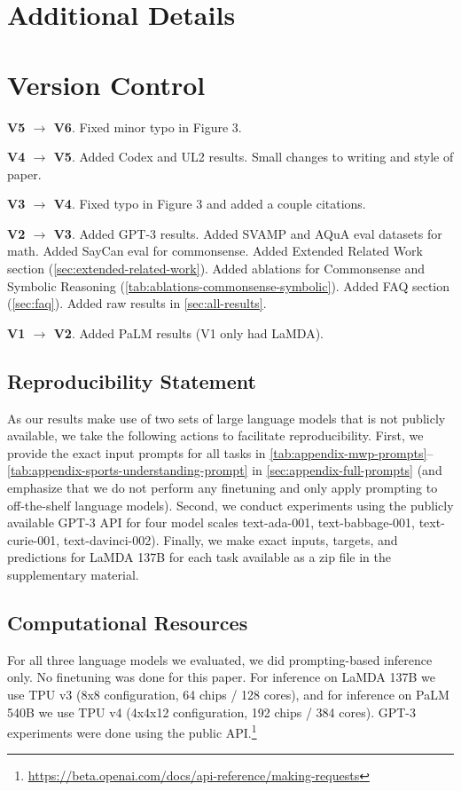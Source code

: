 \documentclass[]{article}
\theoremstyle{plain}
\theoremstyle{definition}
\theoremstyle{remark}
\newcommand{\lamda}[0]{LaMDA}
\newcommand{\palm}[0]{PaLM}
\begin{document}
\clearpage
\section{Additional Details}


\section*{Version Control}
\textbf{V5 $\rightarrow$ V6}. Fixed minor typo in Figure 3.  

\textbf{V4 $\rightarrow$ V5}. Added Codex and UL2 results. Small changes to writing and style of paper.

\textbf{V3 $\rightarrow$ V4}. Fixed typo in Figure 3 and added a couple citations.

\textbf{V2 $\rightarrow$ V3}. Added GPT-3 results. Added SVAMP and AQuA eval datasets for math. Added SayCan eval for commonsense. Added Extended Related Work section (\cref{sec:extended-related-work}). Added ablations for Commonsense and Symbolic Reasoning (\cref{tab:ablations-commonsense-symbolic}). Added FAQ section (\cref{sec:faq}). Added raw results in \cref{sec:all-results}.

\textbf{V1 $\rightarrow$ V2}. Added \palm{} results (V1 only had \lamda{}).

\subsection{Reproducibility Statement}\label{subsec:reproducibility}
As our results make use of two sets of large language models that is not publicly available, we take the following actions to facilitate reproducibility. 
First, we provide the exact input prompts for all tasks in \cref{tab:appendix-mwp-prompts}--\cref{tab:appendix-sports-understanding-prompt} in \cref{sec:appendix-full-prompts} (and emphasize that we do not perform any finetuning and only apply prompting to off-the-shelf language models). 
Second, we conduct experiments using the publicly available GPT-3 API for four model scales text-ada-001, text-babbage-001, text-curie-001, text-davinci-002).
Finally, we make exact inputs, targets, and predictions for \lamda{} 137B for each task available as a zip file in the supplementary material.


\subsection{Computational Resources}\label{subsec:computational-resources}
For all three language models we evaluated, we did prompting-based inference only. No finetuning was done for this paper. For inference on \lamda{} 137B we use TPU v3 (8x8 configuration, 64 chips / 128 cores), and for inference on \palm{} 540B we use TPU v4 (4x4x12 configuration, 192 chips / 384 cores). GPT-3 experiments were done using the public API.\footnote{\url{https://beta.openai.com/docs/api-reference/making-requests}}
\end{document}

